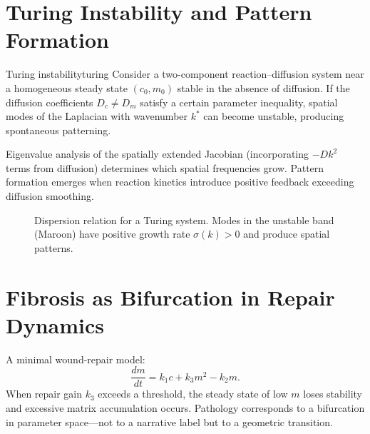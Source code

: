 \documentclass[12pt,openany]{book}
\begin{document}
\section{Turing Instability and Pattern Formation}

\begin{theorem}{Turing instability}{turing}
  Consider a two-component reaction--diffusion system near a homogeneous steady
  state $(c_0,m_0)$ stable in the absence of diffusion. If the diffusion
  coefficients $D_c\neq D_m$ satisfy a certain parameter inequality, spatial
  modes of the Laplacian with wavenumber $k^*$ can become unstable, producing
  spontaneous patterning.
\end{theorem}

Eigenvalue analysis of the spatially extended Jacobian (incorporating
$-Dk^2$ terms from diffusion) determines which spatial frequencies grow.
Pattern formation emerges when reaction kinetics introduce positive feedback
exceeding diffusion smoothing.

\begin{figure}[H]
\centering
{}
\caption{Dispersion relation for a Turing system. Modes in the unstable band
(Maroon) have positive growth rate $\sigma(k)>0$ and produce spatial
patterns.}
\label{fig:turing}
\end{figure}

\section{Fibrosis as Bifurcation in Repair Dynamics}

A minimal wound-repair model:
\[
  \frac{dm}{dt} = k_1 c + k_3 m^2 - k_2 m.
\]
When repair gain $k_3$ exceeds a threshold, the steady state of low $m$ loses
stability and excessive matrix accumulation occurs. Pathology corresponds to a
bifurcation in parameter space—not to a narrative label but to a geometric
transition.
\end{document}
